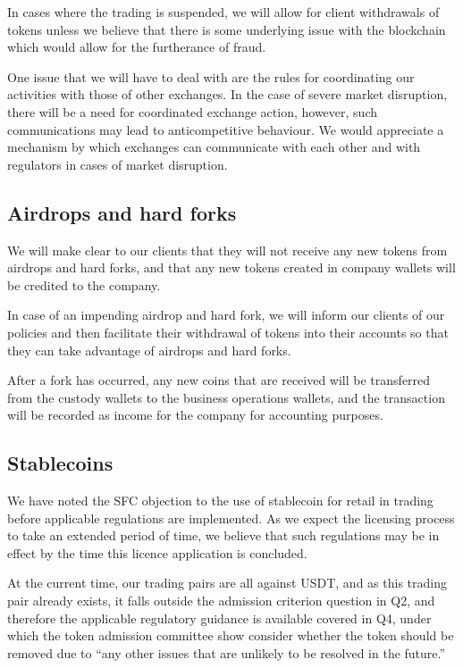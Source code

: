 In cases where the trading is suspended, we will allow for client
withdrawals of tokens unless we believe that there is some underlying
issue with the blockchain which would allow for the furtherance of
fraud.

One issue that we will have to deal with are the rules for coordinating our
activities with those of other exchanges.  In the case of severe market
disruption, there will be a need for coordinated exchange action,
however, such communications may lead to anticompetitive behaviour.  We
would appreciate a mechanism by which exchanges can communicate with
each other and with regulators in cases of market disruption.

\subsection{Airdrops and hard forks}
We will make clear to our clients that they will not receive any
new tokens from airdrops and hard forks, and that any new tokens
created in company wallets will be credited to the company.

In case of an impending airdrop and hard fork, we will inform our
clients of our policies and then facilitate their withdrawal of tokens
into their accounts so that they can take advantage of airdrops and
hard forks.

After a fork has occurred, any new coins that are received will be transferred from the custody wallets to the business operations wallets, and the transaction will be recorded as income for the company for accounting purposes.

\subsection{Stablecoins}
We have noted the SFC objection to the use of stablecoin for retail in
trading before applicable regulations are implemented.  As we expect
the licensing process to take an extended period of time, we believe
that such regulations may be in effect by the time this licence
application is concluded.

At the current time, our trading pairs are all against USDT, and as
this trading pair already exists, it falls outside the admission
criterion question in Q2, and therefore the applicable regulatory
guidance is available covered in Q4, under which the token admission
committee show consider whether the token should be removed due to
``any other issues that are unlikely to be resolved in the future.''

